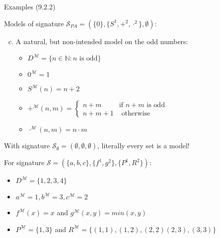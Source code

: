 \begin{frame}{Examples (9.2.2)}

Models of signature $\mathcal{S}_{PA}=(\{0\}, \{S^1, +^2, \cdot^2\}, \emptyset)$:
				
				\begin{enumerate}[(a)]
				
				\setcounter{enumi}{2}


					\item A natural, but non-intended model on the odd numbers:
					
						\begin{itemize}
					
							\item $D^\mathcal{M}=\{n\in\mathbb{N}:n\text{ is odd}\}$
																					\item $0^\mathcal{M}=1$
					
							\item $S^\mathcal{M}(n)=n+2$
							
							\item $+^\mathcal{M}(n,m)=\begin{cases}n+m&\text{if }n+m\text{ is odd}\\n+m+1&\text{ otherwise}\end{cases}$
							
							\item $\cdot^\mathcal{M}(n,m)=n\cdot m$
					
						\end{itemize}
					
			\end{enumerate}
			
\vspace{2ex}			
			
With signature $\mathcal{S}_\emptyset=(\emptyset,\emptyset,\emptyset)$, literally every set is a model!

\vspace{2ex}
				
For signature $\mathcal{S}=(\{a,b,c\}, \{f^1, g^2\}, \{P^1, R^2\})$:
							
						
						\begin{itemize}
						
							\item $D^\mathcal{M}=\{1,2,3,4\}$
							
							\item $a^\mathcal{M}=1, b^\mathcal{M}=3, c^\mathcal{M}=2$
						
							\item $f^\mathcal{M}(x)=x$ and $g^\mathcal{M}(x,y)=min(x,y)$
							
							\item $P^\mathcal{M}=\{1,3\}$ and $R^\mathcal{M}=\{(1,1), (1,2),(2,2) (2,3), (3,3)\}$
						
						\end{itemize}
						
						
					
	
	
\end{frame}

